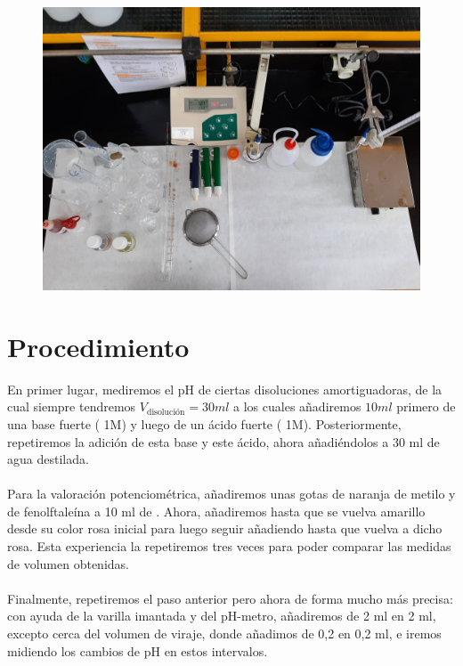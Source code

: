 \begin{figure}[H]
    \centering
    \hspace*{-2.3cm}
        \includegraphics[scale = 0.15, angle=180]{prac3/Inventario3.jpeg}
    \hspace*{-2.3cm}
    \vspace{-2cm}
\end{figure}

\clearpage

\section{Procedimiento}
\noindent En primer lugar, mediremos el pH de ciertas disoluciones amortiguadoras, de la cual siempre tendremos $V_{\text{disolución}} = 30 \si{ml}$ a los cuales añadiremos $10 \si{ml}$ primero de una base fuerte ( 1\si{M}) y luego de un ácido fuerte ( 1\si{M}). Posteriormente, repetiremos la adición de esta base y este ácido, ahora añadiéndolos a 30 \si{ml} de agua destilada.\\\\
Para la valoración potenciométrica, añadiremos unas gotas de naranja de metilo y de fenolftaleína a 10 \si{ml} de . Ahora, añadiremos  hasta que se vuelva amarillo desde su color rosa inicial para luego seguir añadiendo hasta que vuelva a dicho rosa. Esta experiencia la repetiremos tres veces para poder comparar las medidas de volumen obtenidas.\\\\
Finalmente, repetiremos el paso anterior pero ahora de forma mucho más precisa: con ayuda de la varilla imantada y del pH-metro, añadiremos  de 2 \si{ml} en 2 \si{ml}, excepto cerca del volumen de viraje, donde añadimos de 0,2 en 0,2 \si{ml}, e iremos midiendo los cambios de pH en estos intervalos.

